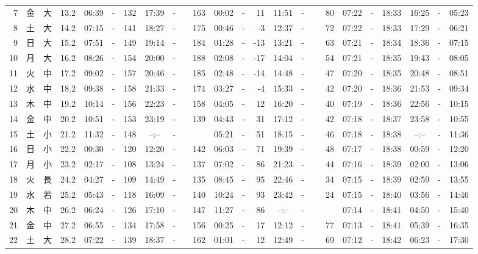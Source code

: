 \documentclass[12pt,a4j]{jsarticle}
\begin{document}
\begin{table}[htbp]
\begin{center}
{\begin{tabular}{|rc|cr|ccrccr|ccrccr|ccc|ccc|}
 7 & 金 & 大 & 13.2 &  06:39 &-& 132 &  17:39 &-& 163 &  00:02 &-&  11 &  11:51 &-&  80 & 07:22 & -& 18:33 & 16:25 & -& 05:23 \\
 8 & 土 & 大 & 14.2 &  07:15 &-& 141 &  18:27 &-& 175 &  00:46 &-&  -3 &  12:37 &-&  72 & 07:22 & -& 18:33 & 17:29 & -& 06:21 \\
 9 & 日 & 大 & 15.2 &  07:51 &-& 149 &  19:14 &-& 184 &  01:28 &-& -13 &  13:21 &-&  63 & 07:21 & -& 18:34 & 18:36 & -& 07:15 \\
10 & 月 & 大 & 16.2 &  08:26 &-& 154 &  20:00 &-& 188 &  02:08 &-& -17 &  14:04 &-&  54 & 07:21 & -& 18:35 & 19:43 & -& 08:05 \\
11 & 火 & 中 & 17.2 &  09:02 &-& 157 &  20:46 &-& 185 &  02:48 &-& -14 &  14:48 &-&  47 & 07:20 & -& 18:35 & 20:48 & -& 08:51 \\
12 & 水 & 中 & 18.2 &  09:38 &-& 158 &  21:33 &-& 174 &  03:27 &-&  -4 &  15:33 &-&  42 & 07:20 & -& 18:36 & 21:53 & -& 09:34 \\
13 & 木 & 中 & 19.2 &  10:14 &-& 156 &  22:23 &-& 158 &  04:05 &-&  12 &  16:20 &-&  40 & 07:19 & -& 18:36 & 22:56 & -& 10:15 \\
14 & 金 & 中 & 20.2 &  10:51 &-& 153 &  23:19 &-& 139 &  04:43 &-&  31 &  17:12 &-&  42 & 07:18 & -& 18:37 & 23:58 & -& 10:55 \\
15 & 土 & 小 & 21.2 &  11:32 &-& 148 &  --:-- &-&~~~~~ &  05:21 &-&  51 &  18:15 &-&  46 & 07:18 & -& 18:38 & --:-- & -& 11:36 \\
16 & 日 & 小 & 22.2 &  00:30 &-& 120 &  12:20 &-& 142 &  06:03 &-&  71 &  19:39 &-&  48 & 07:17 & -& 18:38 & 00:59 & -& 12:20 \\
17 & 月 & 小 & 23.2 &  02:17 &-& 108 &  13:24 &-& 137 &  07:02 &-&  86 &  21:23 &-&  44 & 07:16 & -& 18:39 & 02:00 & -& 13:06 \\
18 & 火 & 長 & 24.2 &  04:27 &-& 109 &  14:49 &-& 135 &  08:45 &-&  95 &  22:46 &-&  34 & 07:15 & -& 18:39 & 02:59 & -& 13:55 \\
19 & 水 & 若 & 25.2 &  05:43 &-& 118 &  16:09 &-& 140 &  10:24 &-&  93 &  23:42 &-&  24 & 07:15 & -& 18:40 & 03:56 & -& 14:46 \\
20 & 木 & 中 & 26.2 &  06:24 &-& 126 &  17:10 &-& 147 &  11:27 &-&  86 &  --:-- &-&~~~~~ & 07:14 & -& 18:41 & 04:50 & -& 15:40 \\
21 & 金 & 中 & 27.2 &  06:55 &-& 134 &  17:58 &-& 156 &  00:25 &-&  17 &  12:12 &-&  77 & 07:13 & -& 18:41 & 05:39 & -& 16:35 \\
22 & 土 & 大 & 28.2 &  07:22 &-& 139 &  18:37 &-& 162 &  01:01 &-&  12 &  12:49 &-&  69 & 07:12 & -& 18:42 & 06:23 & -& 17:30 \\

\end{tabular}}
\end{center}
\end{table}
\end{document}
